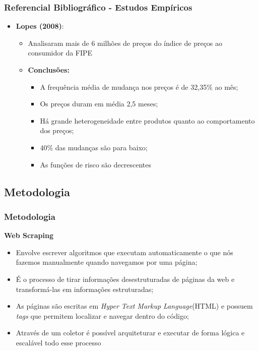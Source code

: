 \documentclass[aspectratio=169]{beamer}
\begin{document}
\begin{frame}\frametitle{Referencial Bibliográfico - Estudos Empíricos}
  \begin{itemize}
  \item \textbf{Lopes (2008)}:
    \begin{itemize}
    \item Analisaram mais de 6 milhões de preços do índice de preços ao consumidor da FIPE
    \item \textbf{Conclusões:} 
      \begin{itemize}
      \item A frequência média de mudança nos preços é de 32,35\% ao mês;
      \item Os preços duram em média 2,5 meses;
      \item Há grande heterogeneidade entre produtos quanto ao comportamento dos preços;
      \item 40\% das mudanças são para baixo;
      \item As funções de risco são decrescentes 
      \end{itemize}
    \end{itemize}
  \end{itemize}
\end{frame}

\subsection{Metodologia}

\begin{frame}\frametitle{Metodologia}
  \textbf{Web Scraping}
  \begin{itemize}
  \item Envolve escrever algoritmos que executam automaticamente o que nós fazemos manualmente quando navegamos por uma página;
  \item É o processo de tirar informações desestruturadas de páginas da web e transformá-las em informações estruturadas;
  \item As páginas são escritas em \emph{Hyper Text Markup Language}(HTML) e possuem \emph{tags} que permitem localizar e navegar dentro do código;
  \item Através de um coletor é possível arquiteturar e executar de forma lógica e escalável todo esse processo
  \end{itemize}
\end{frame}
\end{document}
